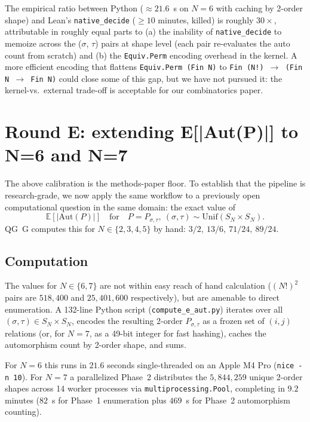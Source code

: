 \documentclass[11pt]{article}
\theoremstyle{definition}
\begin{document}
The empirical ratio between Python ($\approx 21.6$~s on $N=6$ with caching by
2-order shape) and Lean's \texttt{native\_decide} ($\ge 10$ minutes, killed) is
roughly $30\times$, attributable in roughly equal parts to (a) the inability of
\texttt{native\_decide} to memoize across the (\(\sigma\), \(\tau\)) pairs at
shape level (each pair re-evaluates the auto count from scratch) and (b) the
\texttt{Equiv.Perm} encoding overhead in the kernel. A more efficient encoding
that flattens \texttt{Equiv.Perm (Fin N)} to \texttt{Fin (N!) $\to$ (Fin N $\to$
Fin N)} could close some of this gap, but we have not pursued it: the kernel-vs.\
external trade-off is acceptable for our combinatorics paper.

\section{Round E: extending E[|Aut(P)|] to N=6 and N=7}\label{sec:rounde}

The above calibration is the methods-paper floor. To establish that the pipeline
is research-grade, we now apply the same workflow to a previously open
computational question in the same domain: the exact value of
\[
    \mathbb{E}[|\mathrm{Aut}(P)|] \quad\text{for}\quad P = P_{\sigma, \tau},\ (\sigma, \tau) \sim \mathrm{Unif}(S_N \times S_N).
\]
QG~G computes this for $N \in \{2, 3, 4, 5\}$ by hand:
$3/2,\ 13/6,\ 71/24,\ 89/24$.

\subsection{Computation}

The values for $N \in \{6, 7\}$ are not within easy reach of hand calculation
($(N!)^2$ pairs are $518{,}400$ and $25{,}401{,}600$ respectively), but are
amenable to direct enumeration. A 132-line Python script
(\texttt{compute\_e\_aut.py}) iterates over all
$(\sigma, \tau) \in S_N \times S_N$, encodes the resulting 2-order $P_{\sigma,
\tau}$ as a frozen set of $(i, j)$ relations (or, for $N = 7$, as a 49-bit
integer for fast hashing), caches the automorphism count by 2-order shape, and
sums.

For $N = 6$ this runs in $21.6$ seconds single-threaded on an Apple M4 Pro
(\texttt{nice -n 10}). For $N = 7$ a parallelized Phase~2 distributes the
$5{,}844{,}259$ unique 2-order shapes across 14 worker processes via
\texttt{multiprocessing.Pool}, completing in $9.2$ minutes
($82$~s for Phase~1 enumeration plus $469$~s for Phase~2 automorphism counting).
\end{document}
